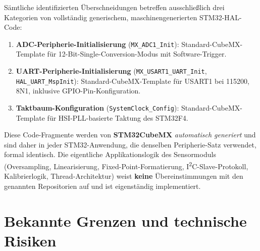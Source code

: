 Sämtliche identifizierten Überschneidungen betreffen ausschließlich drei Kategorien von vollständig generischem, maschinengenerierten STM32-HAL-Code:
\begin{enumerate}
  \item \textbf{ADC-Peripherie-Initialisierung} (\texttt{MX\_ADC1\_Init}): Standard-CubeMX-Template für 12-Bit-Single-Conversion-Modus mit Software-Trigger.
  \item \textbf{UART-Peripherie-Initialisierung} (\texttt{MX\_USART1\_UART\_Init}, \texttt{HAL\_UART\_MspInit}): Standard-CubeMX-Template für USART1 bei \qty{115200}{\baud}, 8N1, inklusive GPIO-Pin-Konfiguration.
  \item \textbf{Taktbaum-Konfiguration} (\texttt{SystemClock\_Config}): Standard-CubeMX-Template für HSI-PLL-basierte Taktung des STM32F4.
\end{enumerate}

Diese Code-Fragmente werden von \textbf{STM32CubeMX} \emph{automatisch generiert} und sind daher in jeder STM32-Anwendung, die denselben Peripherie-Satz verwendet, formal identisch.
Die eigentliche Applikationslogik des Sensormoduls (Oversampling, Linearisierung, Fixed-Point-Formatierung, I\textsuperscript{2}C-Slave-Protokoll, Kalibrierlogik, Thread-Architektur) weist \textbf{keine} Übereinstimmungen mit den genannten Repositorien auf und ist eigenständig implementiert.

\section{Bekannte Grenzen und technische Risiken}

